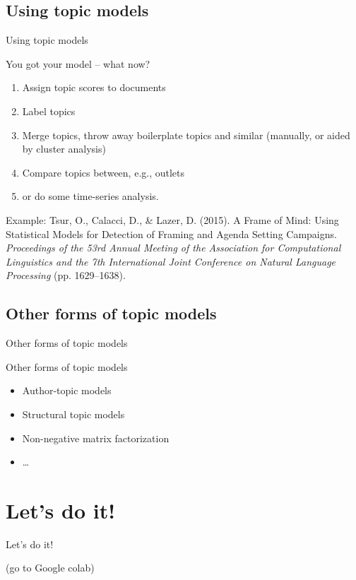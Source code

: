 \documentclass{beamer}
\begin{document}


\subsection{Using topic models}

\begin{frame}{Using topic models}

You got your model -- what now?

\begin{enumerate}
	\item Assign topic scores to documents
	\item Label topics
	\item Merge topics, throw away boilerplate topics and similar (manually, or aided by cluster analysis)
	\item Compare topics between, e.g., outlets
	\item or do some time-series analysis.
\end{enumerate}


Example:
\tiny{Tsur, O., Calacci, D., \& Lazer, D. (2015). A Frame of Mind: Using Statistical Models for Detection of Framing and Agenda Setting Campaigns. \textit{Proceedings of the 53rd Annual Meeting of the Association for Computational Linguistics and the 7th International Joint Conference on Natural Language Processing} (pp. 1629–1638).}



\end{frame}



\subsection{Other forms of topic models}


\begin{frame}[plain]
Other forms of topic models
\end{frame}

\begin{frame}{Other forms of topic models}
\begin{itemize}
	\item Author-topic models
	\item Structural topic models
	\item Non-negative matrix factorization
	\item \ldots
\end{itemize}
\end{frame}




\section{Let's do it!}
\begin{frame}[plain]

\centering
\Huge{Let's do it!}
\vspace{2cm}

\normalsize{(go to Google colab)}
\end{frame}
\end{document}
